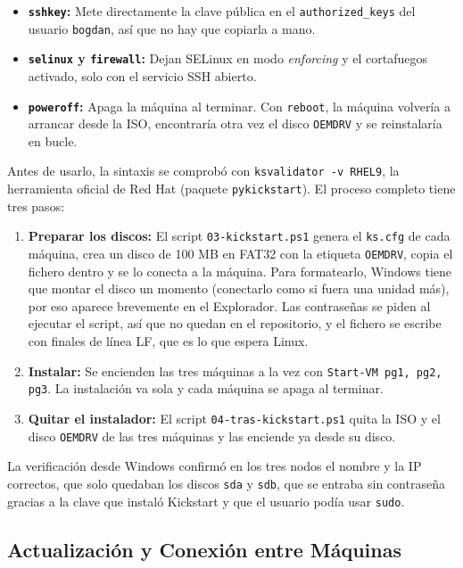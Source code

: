 \documentclass[11pt, a4paper, titlepage]{article}
\newcommand{\cod}[1]{\texttt{#1}}
\begin{document}
\begin{itemize}
    \item \textbf{\cod{sshkey}:} Mete directamente la clave pública en el \cod{authorized\_keys} del usuario \cod{bogdan}, así que no hay que copiarla a mano.
    \item \textbf{\cod{selinux} y \cod{firewall}:} Dejan SELinux en modo \textit{enforcing} y el cortafuegos activado, solo con el servicio SSH abierto.
    \item \textbf{\cod{poweroff}:} Apaga la máquina al terminar. Con \cod{reboot}, la máquina volvería a arrancar desde la ISO, encontraría otra vez el disco \cod{OEMDRV} y se reinstalaría en bucle.
\end{itemize}

Antes de usarlo, la sintaxis se comprobó con \cod{ksvalidator -v RHEL9}, la herramienta oficial de Red Hat (paquete \cod{pykickstart}). El proceso completo tiene tres pasos:

\begin{enumerate}
    \item \textbf{Preparar los discos:} El script \cod{03-kickstart.ps1} genera el \cod{ks.cfg} de cada máquina, crea un disco de 100 MB en FAT32 con la etiqueta \cod{OEMDRV}, copia el fichero dentro y se lo conecta a la máquina. Para formatearlo, Windows tiene que montar el disco un momento (conectarlo como si fuera una unidad más), por eso aparece brevemente en el Explorador. Las contraseñas se piden al ejecutar el script, así que no quedan en el repositorio, y el fichero se escribe con finales de línea LF, que es lo que espera Linux.
    \item \textbf{Instalar:} Se encienden las tres máquinas a la vez con \cod{Start-VM pg1, pg2, pg3}. La instalación va sola y cada máquina se apaga al terminar.
    \item \textbf{Quitar el instalador:} El script \cod{04-tras-kickstart.ps1} quita la ISO y el disco \cod{OEMDRV} de las tres máquinas y las enciende ya desde su disco.
\end{enumerate}

La verificación desde Windows confirmó en los tres nodos el nombre y la IP correctos, que solo quedaban los discos \cod{sda} y \cod{sdb}, que se entraba sin contraseña gracias a la clave que instaló Kickstart y que el usuario podía usar \cod{sudo}.

\subsection{Actualización y Conexión entre Máquinas}
\end{document}
